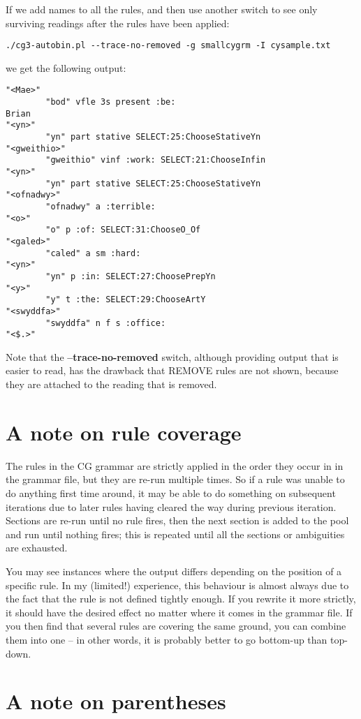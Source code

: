 \documentclass[a4paper,10pt]{article}
\begin{document}
If we add names to all the rules, and then use another switch to see only surviving readings after the rules have been applied:
\begin{Verbatim}[tabsize=4]
./cg3-autobin.pl --trace-no-removed -g smallcygrm -I cysample.txt
\end{Verbatim}
we get the following output:
\begin{Verbatim}[tabsize=4]
"<Mae>"
        "bod" vfle 3s present :be:
Brian
"<yn>"
        "yn" part stative SELECT:25:ChooseStativeYn
"<gweithio>"
        "gweithio" vinf :work: SELECT:21:ChooseInfin
"<yn>"
        "yn" part stative SELECT:25:ChooseStativeYn
"<ofnadwy>"
        "ofnadwy" a :terrible:
"<o>"
        "o" p :of: SELECT:31:ChooseO_Of
"<galed>"
        "caled" a sm :hard:
"<yn>"
        "yn" p :in: SELECT:27:ChoosePrepYn
"<y>"
        "y" t :the: SELECT:29:ChooseArtY
"<swyddfa>"
        "swyddfa" n f s :office:
"<$.>"
\end{Verbatim}
Note that the \textbf{--trace-no-removed} switch, although providing output that is easier to read, has the drawback that REMOVE rules are not shown, because they are attached to the reading that is removed.


\section{A note on rule coverage}

The rules in the CG grammar are strictly applied in the order they occur in in the grammar file, but they are re-run multiple times. So if a rule was unable to do anything first time around, it may be able to do something on subsequent iterations due to later rules having cleared the way during previous iteration.  Sections are re-run until no rule fires, then the next section is added to the pool and run until nothing fires;  this is repeated until all the sections or ambiguities are exhausted. 

You may see instances where the output differs depending on the position of a specific rule.  In my (limited!) experience, this behaviour is almost always due to the fact that the rule is not defined tightly enough.  If you rewrite it more strictly, it should have the desired effect no matter where it comes in the grammar file.  If you then find that several rules are covering the same ground, you can combine them into one -- in other words, it is probably better to go bottom-up than top-down.

\section{A note on parentheses}
\end{document}
